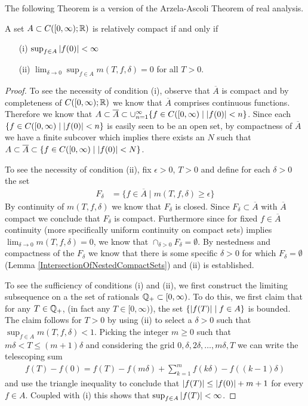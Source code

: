 The following Theorem is a version of the Arzela-Ascoli Theorem of
real analysis.
\begin{thm}\label{ArzelaAscoliTheorem}A set $A
  \subset C([0,\infty); \mathbb{R})$ is relatively compact if and only if 
\begin{itemize}
\item[(i)]$\sup_{f \in A} \left \vert f(0) \right \vert < \infty$
\item[(ii)]$\lim_{\delta \to 0} \sup_{f \in A} m(T, f, \delta) = 0$
  for all $T > 0$.
\end{itemize}
\end{thm}
\begin{proof}
To see the necessity of condition (i), observe that $\overline{A}$ is
compact and by completeness of $C([0,\infty); \mathbb{R})$ we know that
$\overline{A}$ comprises continuous functions.  Therefore we know that
$A \subset \overline{A} \subset \cup_{n=1}^\infty \lbrace f \in
C([0,\infty) \mid
\left \vert f(0) \right \vert < n\rbrace$.  Since each $\lbrace f \in
C([0,\infty) \mid
\left \vert f(0) \right \vert < n\rbrace$ is easily seen to be an open set, by
compactness of $\overline{A}$ we have a finite subcover which implies
there exists an $N$ such that $A \subset \overline{A} \subset \lbrace f \in
C([0,\infty) \mid
\left \vert f(0) \right \vert < N\rbrace$.

To see the necessity of condition (ii), fix $\epsilon > 0$, $T > 0$
and define for each $\delta > 0$ the set 
\begin{align*}
F_\delta &= \lbrace f \in \overline{A} \mid m(T, f, \delta) \geq
\epsilon \rbrace
\end{align*}
By continuity of $m(T, f, \delta)$ we know that $F_\delta$ is closed.
Since $F_\delta \subset \overline{A}$ with $\overline{A}$ compact we
conclude that $F_\delta$ is compact.  Furthermore since for fixed $f
\in \overline{A}$ continuity (more specifically uniform continuity on compact
sets) implies $\lim_{\delta \to 0} m(T,f,\delta) = 0$, we know that
$\cap_{\delta > 0} F_\delta = \emptyset$.  By nestedness and
compactness of the
$F_\delta$ we know that there is some specific $\delta>0$ for which $F_\delta =
\emptyset$ (Lemma \ref{IntersectionOfNestedCompactSets}) and (ii) is established.

To see the sufficiency of conditions (i) and (ii), we first construct
the limiting subsequence on a the set of rationals $\mathbb{Q}_+
\subset [0,\infty)$.  To do this, we first claim that for any $T \in
\mathbb{Q}_+$, (in fact any $T \in [0,\infty)$), the set $\lbrace
\left \vert f(T) \right \vert \mid f \in A \rbrace$ is bounded.  The claim follows for
$T>0$ by using (ii) to select a $\delta > 0$ such that $\sup_{f \in A} m(T, f,
\delta) < 1$.  Picking the integer $m \geq 0$ such that $m \delta < T \leq
(m+1)\delta$ and considering  the grid $0, \delta, 2\delta, \dotsc,
m\delta, T$ we can write the telescoping sum
\begin{align*}
f(T) - f(0) = f(T) - f(m\delta) + \sum_{k=1}^m f(k \delta) - f((k-1)\delta)
\end{align*}
and use the triangle inequality to conclude that $\left \vert f(T) \right \vert
\leq \left \vert f(0) \right \vert + m+1$ for every $f \in A$.  Coupled with (i) this shows that
$\sup_{f \in A} \left \vert f(T) \right \vert < \infty$.


\end{proof}
